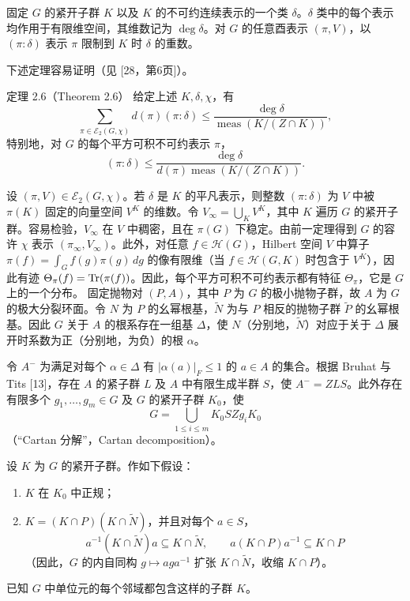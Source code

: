 固定 $G$ 的紧开子群 $K$ 以及 $K$ 的不可约连续表示的一个类 $\delta$。$\delta$ 类中的每个表示均作用于有限维空间，其维数记为 $\deg\delta$。对 $G$ 的任意酉表示 $(\pi,V)$，以 $(\pi:\delta)$ 表示 $\pi$ 限制到 $K$ 时 $\delta$ 的重数。

下述定理容易证明（见 [28，第6页]）。
\begin{originaltheorem}{定理 2.6（Theorem 2.6）}
给定上述 $K,\delta,\chi$，有
\[
\sum_{\pi\in\mathcal E_2(G,\chi)}d(\pi)(\pi:\delta)
\leq\frac{\deg\delta}{\operatorname{meas}(K/(Z\cap K))},\tag{8}
\]
特别地，对 $G$ 的每个平方可积不可约表示 $\pi$，
\[
(\pi:\delta)\leq\frac{\deg\delta}{d(\pi)\operatorname{meas}(K/(Z\cap K))}.\tag{9}
\]
\end{originaltheorem}
设 $(\pi,V)\in\mathcal E_2(G,\chi)$。若 $\delta$ 是 $K$ 的平凡表示，则整数 $(\pi:\delta)$ 为 $V$ 中被 $\pi(K)$ 固定的向量空间 $V^K$ 的维数。令 $V_\infty=\bigcup_KV^K$，其中 $K$ 遍历 $G$ 的紧开子群。容易检验，$V_\infty$ 在 $V$ 中稠密，且在 $\pi(G)$ 下稳定。由前一定理得到 $G$ 的容许 $\chi$ 表示 $(\pi_\infty,V_\infty)$。此外，对任意 $f\in\mathcal H(G)$，Hilbert 空间 $V$ 中算子 $\pi(f)=\int_Gf(g)\pi(g)\,dg$ 的像有限维（当 $f\in\mathcal H(G,K)$ 时包含于 $V^K$），因此有迹 $\Theta_\pi(f)=\operatorname{Tr}(\pi(f))$。因此，每个平方可积不可约表示都有特征 $\Theta_\pi$，它是 $G$ 上的一个分布。
固定抛物对 $(P,A)$，其中 $P$ 为 $G$ 的极小抛物子群，故 $A$ 为 $G$ 的极大分裂环面。令 $N$ 为 $P$ 的幺幂根基，$\widetilde N$ 为与 $P$ 相反的抛物子群 $\widetilde P$ 的幺幂根基。因此 $G$ 关于 $A$ 的根系存在一组基 $\Delta$，使 $N$（分别地，$\widetilde N$）对应于关于 $\Delta$ 展开时系数为正（分别地，为负）的根 $\alpha$。

令 $A^-$ 为满足对每个 $\alpha\in\Delta$ 有 $|\alpha(a)|_F\leq1$ 的 $a\in A$ 的集合。根据 Bruhat 与 Tits [13]，存在 $A$ 的紧子群 $L$ 及 $A$ 中有限生成半群 $S$，使 $A^-=ZLS$。此外存在有限多个 $g_1,\ldots,g_m\in G$ 及 $G$ 的紧开子群 $K_0$，使
\[
G=\bigcup_{1\leq i\leq m}K_0SZg_iK_0
\]
（“Cartan 分解”，Cartan decomposition）。

设 $K$ 为 $G$ 的紧开子群。作如下假设：
\begin{enumerate}
\item[(a)] $K$ 在 $K_0$ 中正规；
\item[(b)] $K=(K\cap P)(K\cap\widetilde N)$，并且对每个 $a\in S$，
\[
a^{-1}(K\cap\widetilde N)a\subseteq K\cap\widetilde N,\qquad a(K\cap P)a^{-1}\subseteq K\cap P
\]
（因此，$G$ 的内自同构 $g\mapsto aga^{-1}$ 扩张 $K\cap\widetilde N$，收缩 $K\cap P$）。
\end{enumerate}
已知 $G$ 中单位元的每个邻域都包含这样的子群 $K$。

